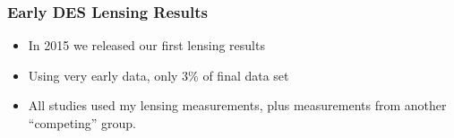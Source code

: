\documentclass{beamer}
\begin{document}
\frame
{

    \frametitle{Early DES Lensing Results}
 
 
    \begin{itemize}

        \item In 2015 we released our first lensing results

        \item Using very early data, only 3\% of final data set

        \item All studies used my lensing measurements, plus measurements
            from another ``competing'' group.

    \end{itemize}

}
\end{document}
